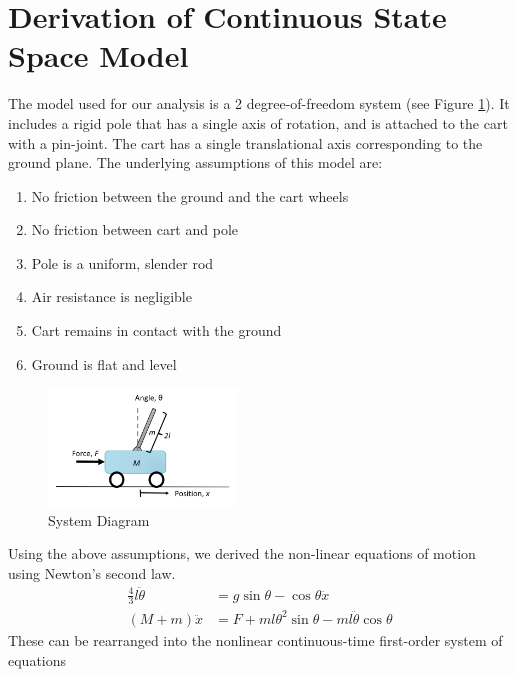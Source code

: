 \documentclass{article}
\begin{document}
\section{Derivation of Continuous State Space Model}

The model used for our analysis is a 2 degree-of-freedom system (see Figure \ref{fig:sys_diagram}). It includes a rigid pole that has a single axis of rotation, and is attached to the cart with a pin-joint. The cart has a single translational axis corresponding to the ground plane. The underlying assumptions of this model are:

\begin{enumerate}
\item No friction between the ground and the cart wheels
\item No friction between cart and pole
\item Pole is a uniform, slender rod
\item Air resistance is negligible
\item Cart remains in contact with the ground
\item Ground is flat and level
\end{enumerate}
\begin{figure}[h!]
	\centering
	\includegraphics[width=5cm,keepaspectratio]{SystemDiagram.png}
	\caption{System Diagram}
	\label{fig:sys_diagram}
\end{figure}
Using the above assumptions, we derived the non-linear equations of motion using Newton's second law.
\begin{equation}
\begin{aligned}
\frac{4}{3}l \ddot{\theta} &= g \sin \theta - \cos \theta \ddot{x} \\
(M+m)\ddot{x} &= F + ml \theta^2 \sin\theta -ml\ddot{\theta}\cos\theta
\end{aligned}
\label{eq:EOM_nonlinear}
\end{equation}
These can be rearranged into the nonlinear continuous-time first-order system of equations
\end{document}
